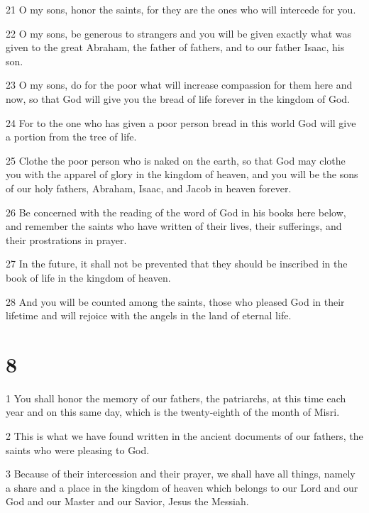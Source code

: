 \par 21 O my sons, honor the saints, for they are the ones who will intercede for you. 

\par 22 O my sons, be generous to strangers and you will be given exactly what was given to the great Abraham, the father of fathers, and to our father Isaac, his son. 

\par 23 O my sons, do for the poor what will increase compassion for them here and now, so that God will give you the bread of life forever in the kingdom of God. 

\par 24 For to the one who has given a poor person bread in this world God will give a portion from the tree of life. 

\par 25 Clothe the poor person who is naked on the earth, so that God may clothe you with the apparel of glory in the kingdom of heaven, and you will be the sons of our holy fathers, Abraham, Isaac, and Jacob in heaven forever. 

\par 26 Be concerned with the reading of the word of God in his books here below, and remember the saints who have written of their lives, their sufferings, and their prostrations in prayer. 

\par 27 In the future, it shall not be prevented that they should be inscribed in the book of life in the kingdom of heaven. 

\par 28 And you will be counted among the saints, those who pleased God in their lifetime and will rejoice with the angels in the land of eternal life. 

\chapter{8}

\par 1 You shall honor the memory of our fathers, the patriarchs, at this time each year and on this same day, which is the twenty-eighth of the month of Misri.

\par 2 This is what we have found written in the ancient documents of our fathers, the saints who were pleasing to God. 

\par 3 Because of their intercession and their prayer, we shall have all things, namely a share and a place in the kingdom of heaven which belongs to our Lord and our God and our Master and our Savior, Jesus the Messiah. 


